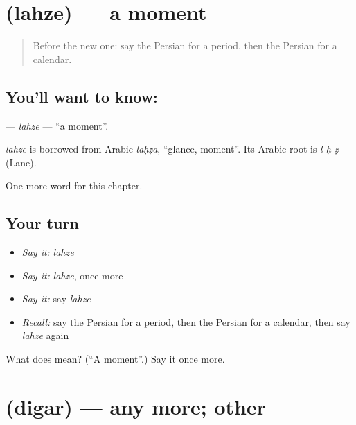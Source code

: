 \section[\texorpdfstring{\fa{لحظه} (lahze)}{لحظه (lahze)}]{ (lahze) — a moment}

\label{lesson:FA-C229-lahze}



\begin{quote}
Before the new one: say the Persian for a period, then the Persian for a calendar.
\end{quote}

\subsection*{You'll want to know: }
\textbf{} — \emph{lahze} — \textquotedblleft{}a moment\textquotedblright{}.

\begin{cousinweb}
\emph{lahze} is borrowed from Arabic \emph{laḥẓa}, \textquotedblleft{}glance, moment\textquotedblright{}. Its Arabic root is \emph{l-ḥ-ẓ} (Lane).
\end{cousinweb}

\begin{grammarlens}[title={What you've built}]
One more word for this chapter.
\end{grammarlens}

\subsection*{Your turn}
\begin{itemize}
\raggedright
  \item \emph{Say it:} \emph{lahze}
  \item \emph{Say it:} \emph{lahze}, once more
  \item \emph{Say it:} say \emph{lahze}
  \item \emph{Recall:} say the Persian for a period, then the Persian for a calendar, then say \emph{lahze} again
\end{itemize}

\begin{tcolorbox}[breakable,colback=teal!4,colframe=teal!35!black,title={Before you move on}]
What does  mean? (\textquotedblleft{}A moment\textquotedblright{}.) Say it once more.
\end{tcolorbox}
\section[\texorpdfstring{\fa{دیگر} (digar)}{دیگر (digar)}]{ (digar) — any more; other}

